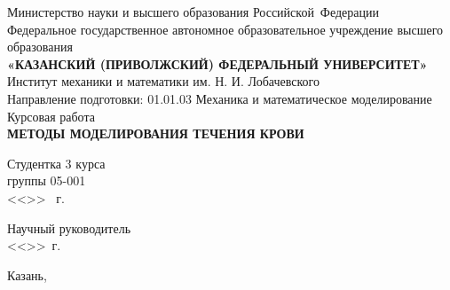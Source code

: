 \begin{titlepage}
\begin{center}

\hfill \break

\large{Министерство науки и высшего образования Российской~Федерации}\\
\footnotesize{Федеральное государственное автономное образовательное учреждение высшего образования}\\ 
\small{\textbf{«КАЗАНСКИЙ (ПРИВОЛЖСКИЙ) ФЕДЕРАЛЬНЫЙ УНИВЕРСИТЕТ»}}\\

\hfill \break
\normalsize{Институт механики и математики им. Н. И. Лобачевского}\\

\hfill \break
\normalsize{Направление подготовки: 01.01.03 Механика и математическое моделирование}\\

\vspace{25mm}
\large{Курсовая работа}\\
\large{\textbf{МЕТОДЫ МОДЕЛИРОВАНИЯ ТЕЧЕНИЯ КРОВИ}}\\
\end{center}

\vspace{20mm}
\noindent
Студентка 3 курса \\
группы 05-001 \\
<<\underline{\hspace{0,75cm}}>> \underline{\hspace{2cm}}\the\year~г.

\hfill \break
Научный руководитель \\
<<\underline{\hspace{0,75cm}}>>\underline{\hspace{2cm}}\the\year~г.

\vspace{\fill}

\begin{center}
    Казань, \the\year
\end{center}
\thispagestyle{empty}

\end{titlepage}
